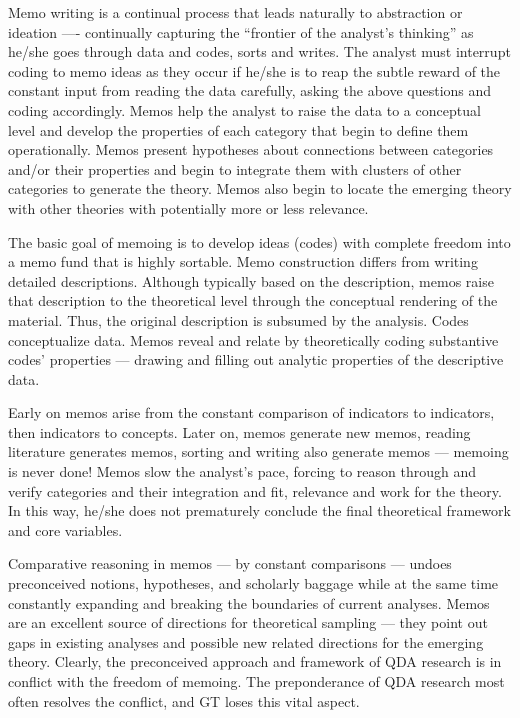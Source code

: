 Memo writing is a continual process that leads naturally to abstraction or
ideation
---- continually capturing the “frontier of the analyst’s thinking” as he/she
goes through data and codes, sorts and writes. 
The analyst must interrupt coding to memo ideas as they occur if he/she is to reap the subtle reward of the constant input from reading the data carefully, 
asking the above questions and coding accordingly. 
Memos help the analyst to raise the data to a conceptual level and develop the properties of each category that begin to define them operationally.
Memos present hypotheses about connections between categories and/or their properties and begin to integrate them with clusters of other categories to generate the theory.
Memos also begin to locate the emerging theory with other theories with potentially more or less relevance.

The basic goal of memoing is to develop ideas (codes) with complete freedom into a memo fund that is highly sortable. 
Memo construction differs from writing detailed descriptions. 
Although typically based on the description, memos raise that description to the theoretical level through the conceptual rendering of the material. 
Thus, the original description is subsumed by the analysis. 
Codes conceptualize data. 
Memos reveal and relate by theoretically coding substantive codes' properties --- drawing and filling out analytic properties of the descriptive data.

Early on memos arise from the constant comparison of indicators to indicators, 
then indicators to concepts. 
Later on, memos generate new memos, 
reading literature generates memos, 
sorting and writing also generate memos
--- memoing is never done! 
Memos slow the analyst’s pace, 
forcing to reason through and verify categories and their integration and fit, 
relevance and work for the theory.
In this way, he/she does not prematurely conclude the final theoretical framework and core variables.

Comparative reasoning in memos 
--- by constant comparisons 
--- undoes preconceived notions, hypotheses, and scholarly baggage while at the same time constantly expanding and breaking the boundaries of current analyses.
Memos are an excellent source of directions for theoretical sampling
--- they point out gaps in existing analyses and possible new related directions for the emerging theory. 
Clearly, the preconceived approach and framework of QDA research is in conflict with the freedom of memoing. 
The preponderance of QDA research most often resolves the conflict, and GT loses this vital aspect.

